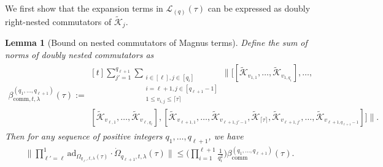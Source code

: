 \documentclass[11pt]{article}
\newtheorem{lemma}{Lemma}
\renewcommand{\L}{\mathcal{L}}
\newcommand{\ad}{\mathrm{ad}}
\renewcommand{\comm}{\mathrm{comm}}
\newcommand{\mc}{\mathcal}
\begin{document}
We first show that the expansion terms in $\L_{(q)}(\tau)$ can be expressed as doubly right-nested commutators of $\tilde{\mc K}_j$.
\begin{lemma}[Bound on nested commutators of Magnus terms]
\label{lem:doubly-nested-bound-final}
    Define the sum of norms of doubly nested commutators as
    \begin{align*}
    \beta_{\comm,t,\lambda}^{(q_1, \ldots, q_{\ell+1})}(\tau) := \begin{multlined}[t]
        \sum_{j'=1}^{q_{\ell+1}} \sum_{\substack{
            i\in[\ell], j\in[q_i] \\
            i=\ell+1, j\in[q_{\ell+1}-1] \\
            1\le v_{i,j} \le \lceil\tau\rceil
        }} \bigg\| \Big[ 
            [\tilde{\mc K}_{v_{1,1}}, \ldots, \tilde{\mc K}_{v_{1,q_1}}], \ldots, \\ 
             [\tilde{\mc K}_{v_{\ell,1}}, \ldots, \tilde{\mc K}_{v_{\ell,q_\ell}}], 
            [\tilde{\mc K}_{v_{\ell+1,1}}, \ldots, \tilde{\mc K}_{v_{\ell+1,j'-1}},\tilde{\mc K}_{\lceil\tau\rceil},\tilde{\mc K}_{v_{\ell+1,j'}}, \ldots, \tilde{\mc K}_{v_{\ell+1,q_{\ell+1}-1}}]
            \Big] \bigg\|.
    \end{multlined}
\end{align*}
    Then for any sequence of positive integers $q_1, \ldots, q_{\ell+1}$, we have
    \begin{align*}
        \bigg\|\prod_{\ell'=\ell}^1 \ad_{\Omega_{q_{\ell'}, t, \lambda}(\tau)}\cdot\dot\Omega_{q_{\ell+1}, t,\lambda}(\tau)\bigg\| \le \bigg(\prod_{i=1}^{\ell+1} \frac{1}{q_i^2}\bigg) \beta_{\comm}^{(q_1, \ldots, q_{\ell+1})}(\tau).
    \end{align*}
\end{lemma}
\end{document}
